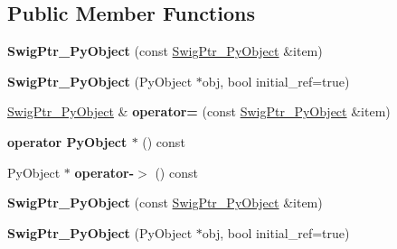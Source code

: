 \subsection*{Public Member Functions}
\begin{DoxyCompactItemize}
\item 
{\bfseries Swig\+Ptr\+\_\+\+Py\+Object} (const \hyperlink{classswig_1_1SwigPtr__PyObject}{Swig\+Ptr\+\_\+\+Py\+Object} \&item)\hypertarget{classswig_1_1SwigPtr__PyObject_a4282f20207f8cd22c9b079203c832a04}{}\label{classswig_1_1SwigPtr__PyObject_a4282f20207f8cd22c9b079203c832a04}

\item 
{\bfseries Swig\+Ptr\+\_\+\+Py\+Object} (Py\+Object $\ast$obj, bool initial\+\_\+ref=true)\hypertarget{classswig_1_1SwigPtr__PyObject_a4503d58d577d209f5e1fa67026852505}{}\label{classswig_1_1SwigPtr__PyObject_a4503d58d577d209f5e1fa67026852505}

\item 
\hyperlink{classswig_1_1SwigPtr__PyObject}{Swig\+Ptr\+\_\+\+Py\+Object} \& {\bfseries operator=} (const \hyperlink{classswig_1_1SwigPtr__PyObject}{Swig\+Ptr\+\_\+\+Py\+Object} \&item)\hypertarget{classswig_1_1SwigPtr__PyObject_a86d8657d6b4a27c8e9e6942bc1ba572c}{}\label{classswig_1_1SwigPtr__PyObject_a86d8657d6b4a27c8e9e6942bc1ba572c}

\item 
{\bfseries operator Py\+Object $\ast$} () const \hypertarget{classswig_1_1SwigPtr__PyObject_aa2f1cdba0651c7a52482d225faef0574}{}\label{classswig_1_1SwigPtr__PyObject_aa2f1cdba0651c7a52482d225faef0574}

\item 
Py\+Object $\ast$ {\bfseries operator-\/$>$} () const \hypertarget{classswig_1_1SwigPtr__PyObject_a97a20cad6a2b0916f39c45555fb559f0}{}\label{classswig_1_1SwigPtr__PyObject_a97a20cad6a2b0916f39c45555fb559f0}

\item 
{\bfseries Swig\+Ptr\+\_\+\+Py\+Object} (const \hyperlink{classswig_1_1SwigPtr__PyObject}{Swig\+Ptr\+\_\+\+Py\+Object} \&item)\hypertarget{classswig_1_1SwigPtr__PyObject_a4282f20207f8cd22c9b079203c832a04}{}\label{classswig_1_1SwigPtr__PyObject_a4282f20207f8cd22c9b079203c832a04}

\item 
{\bfseries Swig\+Ptr\+\_\+\+Py\+Object} (Py\+Object $\ast$obj, bool initial\+\_\+ref=true)\hypertarget{classswig_1_1SwigPtr__PyObject_a4503d58d577d209f5e1fa67026852505}{}\label{classswig_1_1SwigPtr__PyObject_a4503d58d577d209f5e1fa67026852505}


\end{DoxyCompactItemize}
